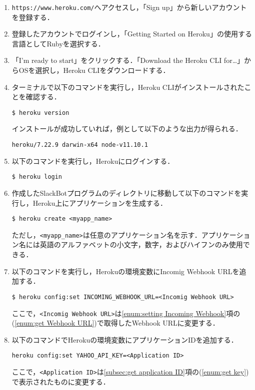 \documentclass[12pt]{jsarticle}
\begin{document}
\begin{enumerate}
\item \verb|https://www.heroku.com/|へアクセスし，「Sign up」から新しいアカウントを登録する．
\item 登録したアカウントでログインし，「Getting Started on Heroku」の使用する言語としてRubyを選択する．
\item 「I’m ready to start」をクリックする．「Download the Heroku CLI for…」からOSを選択し，Heroku CLIをダウンロードする．
\item ターミナルで以下のコマンドを実行し，Heroku CLIがインストールされたことを確認する．
\begin{verbatim}
$ heroku version
\end{verbatim}
インストールが成功していれば，例として以下のような出力が得られる．
\begin{verbatim}
heroku/7.22.9 darwin-x64 node-v11.10.1
\end{verbatim}
\item 以下のコマンドを実行し，Herokuにログインする．
\begin{verbatim}
$ heroku login
\end{verbatim}
\item 作成したSlackBotプログラムのディレクトリに移動して以下のコマンドを実行し，Heroku上にアプリケーションを生成する．
\begin{verbatim}
$ heroku create <myapp_name>
\end{verbatim}
ただし，\verb|<myapp_name>|は任意のアプリケーション名を示す．アプリケーション名には英語のアルファベットの小文字，数字，およびハイフンのみ使用できる．
\item 以下のコマンドを実行し，Herokuの環境変数にIncomig Webhook URLを追加する．
\begin{verbatim}
$ heroku config:set INCOMING_WEBHOOK_URL=<Incomig Webhook URL>
\end{verbatim}
ここで，\verb|<Incomig Webhook URL>|は\ref{enum:setting Incoming Webhook}項の(\ref{enum:get Webhook URL})で取得したWebhook URLに変更する．
\item 以下のコマンドでHerokuの環境変数にアプリケーションIDを追加する．
\begin{verbatim}
heroku config:set YAHOO_API_KEY=<Application ID>
\end{verbatim}
ここで，\verb|<Application ID>|は\ref{subsec:get application ID}項の(\ref{enum:get key})で表示されたものに変更する．
\end{enumerate}
\end{document}
